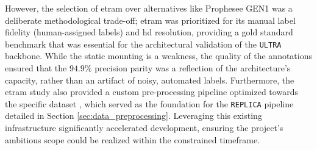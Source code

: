 However, the selection of \gls{etram} over alternatives like Prophesee GEN1 was a deliberate methodological trade-off; \gls{etram} was prioritized for its manual label fidelity (human-assigned labels) and \gls{hd} resolution, providing a gold standard benchmark that was essential for the architectural validation of the \texttt{ULTRA} backbone. 
While the static mounting is a weakness, the quality of the annotations ensured that the $94.9\%$ precision parity was a reflection of the architecture's capacity, rather than an artifact of noisy, automated labels.
Furthermore, the \gls{etram} study also provided a custom pre-processing pipeline optimized towards the specific dataset \cite{Verma_2024_CVPR}, which served as the foundation for the \texttt{REPLICA} pipeline detailed in Section \ref{sec:data_preprocessing}. Leveraging this existing infrastructure significantly accelerated development, ensuring the project's ambitious scope could be realized within the constrained timeframe.
